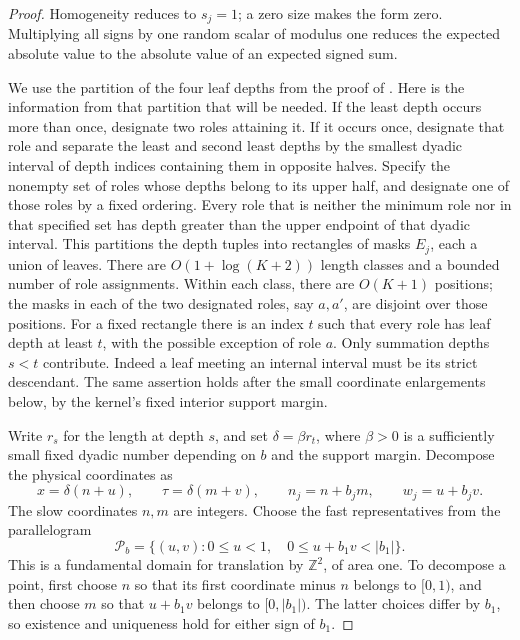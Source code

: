 \begin{proof}
Homogeneity reduces to \(s_j=1\); a zero size makes the form zero.
Multiplying all signs by one random scalar of modulus one reduces the
expected absolute value to the absolute value of an expected signed sum.

We use the partition of the four leaf depths from the proof of
\cite[Lemma~7.2]{H}.  Here is the information from that partition that
will be needed.  If the least depth occurs more than once, designate two
roles attaining it.  If it occurs once, designate that role and
separate the least and second least depths by the smallest dyadic
interval of depth indices containing them in opposite halves.
Specify the nonempty set of roles whose depths belong to its upper
half, and designate one of those roles by a fixed ordering.
Every role that is neither the minimum role nor in that specified set
has depth greater than the upper endpoint of that dyadic interval.
This partitions the depth tuples into rectangles of masks
\(E_j\), each a union of leaves.  There are
\(O(1+\log(K+2))\) length classes and a bounded number of role assignments.
Within each class, there are \(O(K+1)\) positions; the masks in each of
the two designated roles, say \(a,a'\), are disjoint over those positions.
For a fixed rectangle there is an index \(t\) such that every role has
leaf depth at least \(t\), with the possible exception of role \(a\).
Only summation depths \(s<t\) contribute.  Indeed a leaf meeting an
internal interval must be its strict descendant.  The same assertion
holds after the small coordinate enlargements below, by the kernel's
fixed interior support margin.

Write \(r_s\) for the length at depth \(s\), and set
\(\delta=\beta r_t\), where \(\beta>0\) is a sufficiently small fixed
dyadic number depending on \(b\) and the support margin.  Decompose the
physical coordinates as
\[
 x=\delta(n+u),\qquad \tau=\delta(m+v),\qquad
 n_j=n+b_jm,\qquad w_j=u+b_jv.
\]
The slow coordinates \(n,m\) are integers.  Choose the fast
representatives from the parallelogram
\begin{equation}\label{eq:fast-tile}
 \mathcal P_b=
 \{(u,v):0\le u<1,\quad 0\le u+b_1v<|b_1|\}.
\end{equation}
This is a fundamental domain for translation by \(\mathbb Z^2\), of
area one.  To decompose a point, first choose \(n\) so that its first
coordinate minus \(n\) belongs to \([0,1)\), and then choose \(m\) so
that \(u+b_1v\) belongs to \([0,|b_1|)\).  The latter choices differ
by \(b_1\), so existence and uniqueness hold for either sign of \(b_1\).


\end{proof}
